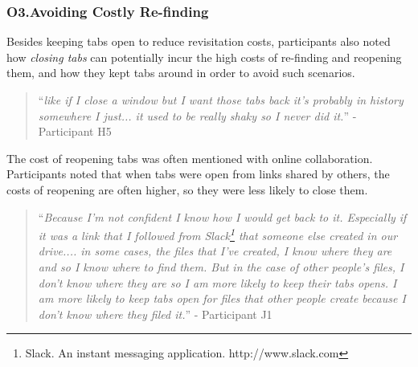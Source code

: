 \subsubsection{O3.Avoiding Costly Re-finding}

Besides keeping tabs open to reduce revisitation costs, participants also noted how \emph{closing tabs} can potentially incur the high costs of re-finding and reopening them, and how they kept tabs around in order to avoid such scenarios.


\begin{quote}
``\emph{like if I close a window but I want those tabs back it's probably in history somewhere I just... it used to be really shaky so I never did it.}'' - Participant H5
\end{quote}



	


The cost of reopening tabs was often mentioned with online collaboration. Participants noted that when tabs were open from links shared by others, the costs of reopening are often higher, so they were less likely to close them.

\begin{quote}
``\emph{Because I'm not confident I know how I would get back to it. Especially if it was a link that I followed from Slack\footnote{Slack. An instant messaging application. http://www.slack.com} that someone else created in our drive.... in some cases, the files that I've created, I know where they are and so I know where to find them. But in the case of other people's files, I don't know where they are so I am more likely to keep their tabs opens. I am more likely to keep tabs open for files that other people create because I don't know where they filed it.}'' - Participant J1
\end{quote}


